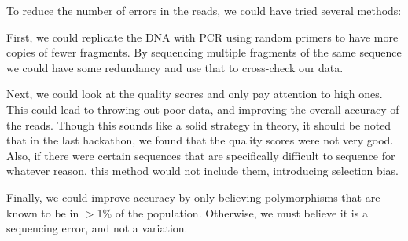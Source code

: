 To reduce the number of errors in the reads, we could have tried several methods:

First, we could replicate the DNA with PCR using random primers to have more copies of
fewer fragments. By sequencing multiple fragments of the same sequence we could have some redundancy and 
use that to cross-check our data.

Next, we could look at the quality scores and only pay attention to high ones.
This could lead to throwing out poor data, and improving the overall accuracy
of the reads. Though this sounds like a solid strategy in theory, it should be
noted that in the last hackathon, we found that the quality scores were not
very good. Also, if there were certain sequences that are specifically difficult to sequence
for whatever reason, this method would not include them, introducing selection bias.

Finally, we could improve accuracy by only believing polymorphisms that are known 
to be in $>$1\% of the population. Otherwise, we must believe it is a sequencing error, and
not a variation. 
